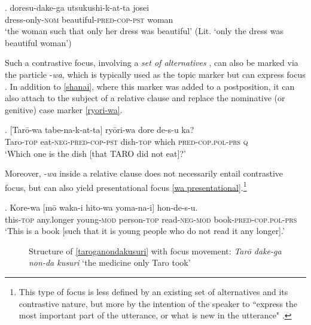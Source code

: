 \exg. doresu-dake-ga utsukushi-k-at-ta josei\\
dress-only-\textsc{nom} beautiful-\textsc{pred-cop-pst} woman\\
`the woman such that only her dress was beautiful' (Lit. `only the dress was beautiful woman’) \label{doresudake}

Such a contrastive focus, involving a \textit{set of alternatives} \citep{zimmermann:2011:focus}, can also be marked via the particle -\textit{wa}, which is typically used as the topic marker but can express focus \citep{vermeulen:2007:jap, vermeulen:2012:info}. In addition to \ref{shanai}, where this marker was added to a postposition, it can also attach to the subject of a relative clause and replace the nominative (or genitive) case marker \ref{ryori-wa}.

\exg. [Tarō-wa tabe-na-k-at-ta] ryōri-wa dore de-s-u ka?\\
Taro-\textsc{top} eat-\textsc{neg-pred-cop-pst} dish-\textsc{top} which \textsc{pred-cop.pol-prs} \textsc{q}\\
`Which one is the dish [that TARO did not eat]?’ \label{ryori-wa}

Moreover, -\textit{wa} inside a relative clause does not necessarily entail contrastive focus, but can also yield presentational focus \ref{wa presentational}.\footnote{This type of focus is less defined by an existing set of alternatives and its contrastive nature, but more by the intention of the speaker to ``express the most important part of the utterance, or what is new in the utterance" \citep[23]{krifka:2007:basic}.}

\exg. Kore-wa [mō waka-i hito-wa yoma-na-i] hon-de-s-u.\\
this-\textsc{top} any.longer young-\textsc{mod} person-\textsc{top} read-\textsc{neg-mod} book-\textsc{pred-cop.pol-prs}\\
`This is a book [such that it is young people who do not read it any longer].’ \label{wa presentational}

\begin{figure}
\caption{Structure of \ref{taroganondakusuri} with focus movement: \textit{Tarō dake-ga non-da kusuri} `the medicine only Taro took'}
\label{Rc with focus movement}
\end{figure}

